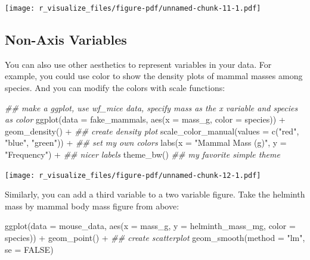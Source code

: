 \documentclass[
  letterpaper,
  DIV=11,
  numbers=noendperiod]{scrreprt}
\newenvironment{Shaded}{\begin{snugshade}}{\end{snugshade}}
\newcommand{\AttributeTok}[1]{\textcolor[rgb]{0.40,0.45,0.13}{#1}}
\newcommand{\ConstantTok}[1]{\textcolor[rgb]{0.56,0.35,0.01}{#1}}
\newcommand{\DocumentationTok}[1]{\textcolor[rgb]{0.37,0.37,0.37}{\textit{#1}}}
\newcommand{\FunctionTok}[1]{\textcolor[rgb]{0.28,0.35,0.67}{#1}}
\newcommand{\NormalTok}[1]{\textcolor[rgb]{0.00,0.23,0.31}{#1}}
\newcommand{\SpecialCharTok}[1]{\textcolor[rgb]{0.37,0.37,0.37}{#1}}
\newcommand{\StringTok}[1]{\textcolor[rgb]{0.13,0.47,0.30}{#1}}
\begin{document}
\texttt{[image: r\_visualize\_files/figure-pdf/unnamed-chunk-11-1.pdf]}

\subsection{Non-Axis Variables}\label{non-axis-variables}

You can also use other aesthetics to represent variables in your data.
For example, you could use color to show the density plots of mammal
masses among species. And you can modify the colors with scale
functions:

\begin{Shaded}
\begin{Highlighting}[]
\DocumentationTok{\#\# make a ggplot, use wf\_mice data, specify mass as the x variable and species as color}
\FunctionTok{ggplot}\NormalTok{(}\AttributeTok{data =}\NormalTok{ fake\_mammals, }\FunctionTok{aes}\NormalTok{(}\AttributeTok{x =}\NormalTok{ mass\_g, }\AttributeTok{color =}\NormalTok{ species)) }\SpecialCharTok{+}
  \FunctionTok{geom\_density}\NormalTok{() }\SpecialCharTok{+} \DocumentationTok{\#\# create density plot}
  \FunctionTok{scale\_color\_manual}\NormalTok{(}\AttributeTok{values =} \FunctionTok{c}\NormalTok{(}\StringTok{"red"}\NormalTok{, }\StringTok{"blue"}\NormalTok{, }\StringTok{"green"}\NormalTok{)) }\SpecialCharTok{+} \DocumentationTok{\#\# set my own colors}
  \FunctionTok{labs}\NormalTok{(}\AttributeTok{x =} \StringTok{"Mammal Mass (g)"}\NormalTok{, }\AttributeTok{y =} \StringTok{"Frequency"}\NormalTok{) }\SpecialCharTok{+} \DocumentationTok{\#\# nicer labels}
  \FunctionTok{theme\_bw}\NormalTok{() }\DocumentationTok{\#\# my favorite simple theme}
\end{Highlighting}
\end{Shaded}

\texttt{[image: r\_visualize\_files/figure-pdf/unnamed-chunk-12-1.pdf]}

Similarly, you can add a third variable to a two variable figure. Take
the helminth mass by mammal body mass figure from above:

\begin{Shaded}
\begin{Highlighting}[]
\FunctionTok{ggplot}\NormalTok{(}\AttributeTok{data =}\NormalTok{ mouse\_data, }\FunctionTok{aes}\NormalTok{(}\AttributeTok{x =}\NormalTok{ mass\_g, }\AttributeTok{y =}\NormalTok{ helminth\_mass\_mg, }\AttributeTok{color =}\NormalTok{ species)) }\SpecialCharTok{+}
  \FunctionTok{geom\_point}\NormalTok{() }\SpecialCharTok{+}  \DocumentationTok{\#\# create scatterplot}
  \FunctionTok{geom\_smooth}\NormalTok{(}\AttributeTok{method =} \StringTok{"lm"}\NormalTok{, }\AttributeTok{se =} \ConstantTok{FALSE}\NormalTok{)}
\end{Highlighting}
\end{Shaded}
\end{document}
